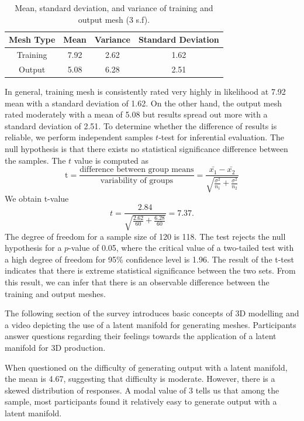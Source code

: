\documentclass[ %
author={Dillon Keith Diep},
supervisor={Dr. Carl Henrik Ek},
degree={MEng},
title={ART-CG Hair:},
subtitle={Assisted Real-time Content Generation of Stylised Virtual Hair},
type={Research},
year={2017} ]{dissertation}
\begin{document}
	\begin{table}[!h]
		\centering
		\begin{tabular}{|c|c|c|c|}
			\hline
			Mesh Type   & Mean      & Variance  & Standard Deviation\\
			\hline
			Training    & 7.92      & 2.62      & 1.62\\
			\hline
			Output      & 5.08      & 6.28      & 2.51\\
			\hline
		\end{tabular}
		\caption{Mean, standard deviation, and variance of training and output mesh (3 s.f).}
	\end{table}
	
	In general, training mesh is consistently rated very highly in likelihood at 7.92 mean with a standard deviation of 1.62. On the other hand, the output mesh rated moderately with a mean of 5.08 but results spread out more with a standard deviation of 2.51. To determine whether the difference of results is reliable, we perform independent samples $t$-test for inferential evaluation. The null hypothesis is that there exists no statistical significance difference between the samples. The $t$ value is computed as
	$$\text{t}=\frac{\text{difference between group means}}{\text{variability of groups}}=\frac{\bar{x_1}-\bar{x_2}}{\sqrt{\frac{\sigma^2}{n_1}+\frac{\sigma^2}{n_2}}}$$
	We obtain t-value
	$$t = \frac{2.84}{\sqrt{\frac{2.62}{60}+\frac{6.28}{60}}}=7.37.$$
	The degree of freedom for a sample size of 120 is 118. The test rejects the null hypothesis for a $p$-value of 0.05, where the critical value of a two-tailed test with a high degree of freedom for 95\% confidence level is 1.96. The result of the t-test indicates that there is extreme statistical significance between the two sets. From this result, we can infer that there is an observable difference between the training and output meshes.
	
	The following section of the survey introduces basic concepts of 3D modelling and a video depicting the use of a latent manifold for generating meshes. Participants answer questions regarding their feelings towards the application of a latent manifold for 3D production.
	
	When questioned on the difficulty of generating output with a latent manifold, the mean is 4.67, suggesting that difficulty is moderate. However, there is a skewed distribution of responses. A modal value of 3 tells us that among the sample, most participants found it relatively easy to generate output with a latent manifold.
	
\end{document}
